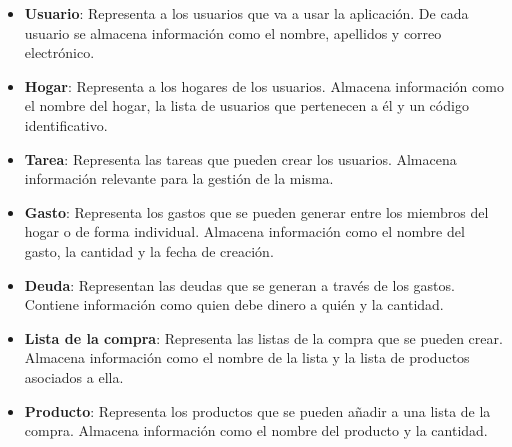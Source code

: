 \begin{itemize}
    \item \textbf{Usuario}: Representa a los usuarios que va a usar la aplicación. De cada usuario se almacena información como el nombre, apellidos y correo electrónico.
    \item \textbf{Hogar}: Representa a los hogares de los usuarios. Almacena información como el nombre del hogar, la lista de usuarios que pertenecen a él y un código identificativo.
    \item \textbf{Tarea}: Representa las tareas que pueden crear los usuarios. Almacena información relevante para la gestión de la misma.
    \item \textbf{Gasto}: Representa los gastos que se pueden generar entre los miembros del hogar o de forma individual. Almacena información como el nombre del gasto, la cantidad y la fecha de creación.
    \item \textbf{Deuda}: Representan las deudas que se generan a través de los gastos. Contiene información como quien debe dinero a quién y la cantidad.
    \item \textbf{Lista de la compra}: Representa las listas de la compra que se pueden crear. Almacena información como el nombre de la lista y la lista de productos asociados a ella.
    \item \textbf{Producto}: Representa los productos que se pueden añadir a una lista de la compra. Almacena información como el nombre del producto y la cantidad.
\end{itemize}